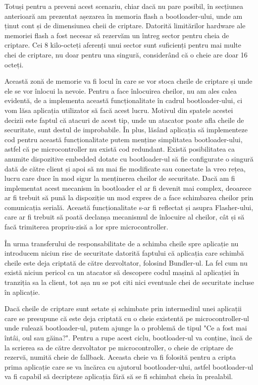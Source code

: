 \documentclass[12pt,a4paper,titlepage]{report}
\begin{document}
Totuși pentru a preveni acest scenariu, chiar dacă nu pare posibil, în secțiunea anterioară am prezentat așezarea în memoria flash a bootloader-ului, unde am ținut cont și de dimensiunea cheii de criptare. Datorită limitărilor hardware ale memoriei flash a fost necesar să rezervăm un întreg sector pentru cheia de criptare. Cei 8 kilo-octeți aferenți unui sector sunt suficienți pentru mai multe chei de criptare, nu doar pentru una singură, considerând că o cheie are doar 16 octeți.

Această zonă de memorie va fi locul în care se vor stoca cheile de criptare și unde ele se vor înlocui la nevoie.
Pentru a face înlocuirea cheilor, nu am ales calea evidentă, de a implementa această funcționalitate în cadrul bootloader-ului, ci vom lăsa aplicația utilizator să facă acest lucru. Motivul din spatele acestei decizii este faptul că atacuri de acest tip, unde un atacator poate afla cheile de securitate, sunt destul de improbabile. În plus, lăsând aplicația să implementeze cod pentru această funcționalitate putem menține simplitatea bootloader-ului, astfel că pe microcontroller nu există cod redundant. Există posibilitatea ca anumite dispozitive embedded dotate cu bootloader-ul să fie configurate o singură dată de către client și apoi să nu mai fie modificate sau conectate la vreo rețea, lucru care duce în mod sigur la menținerea cheilor de securitate. Dacă am fi implementat acest mecanism în bootloader el ar fi devenit mai complex, deoarece ar fi trebuit să pună la dispoziție un mod expres de a face schimbarea cheilor prin comunicația serială. Această funcționalitate s-ar fi reflectat și asupra Flasher-ului, care ar fi trebuit să poată declanșa mecanismul de înlocuire al cheilor, cât și să facă trimiterea propriu-zisă a lor spre microcontroller.

În urma transferului de responsabilitate de a schimba cheile spre aplicație nu introducem niciun risc de securitate datorită faptului că aplicația care schimbă cheile este deja criptată de către dezvoltator, folosind Bundler-ul. La fel cum nu există niciun pericol ca un atacator să descopere codul mașină al aplicației în tranziția sa la client, tot așa nu se pot citi nici eventuale chei de securitate incluse în aplicație.

Dacă cheile de criptare sunt setate și schimbate prin intermediul unei aplicații care se presupune că este deja criptată cu o cheie existentă pe microcontroller-ul unde rulează bootloader-ul, putem ajunge la o problemă de tipul "Ce a fost mai întâi, oul sau găina?". Pentru a rupe acest ciclu, bootloader-ul va conține, încă de la scrierea sa de către dezvoltator pe microcontroller, o cheie de criptare de rezervă, numită cheie de fallback.
Aceasta cheie va fi folosită pentru a cripta prima aplicație care se va încărca cu ajutorul bootloader-ului, astfel bootloader-ul va fi capabil să decripteze aplicația fără să se fi schimbat cheia în prealabil.
\end{document}
